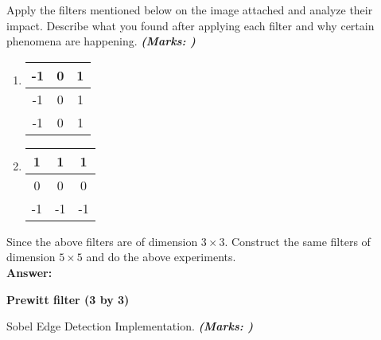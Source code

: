 \documentclass[12pt, a4paper]{exam}
\begin{document}
\vspace{0.2in}
\begin{questions}
	\pointsdroppedatright

	\question
Apply the filters mentioned below on the image attached and analyze their impact.
Describe what you found after applying each filter
and why certain phenomena are happening. \textbf{\textit{(Marks: )}}\\

\begin{enumerate}

\item \begin{center}
\begin{tabular}{|c|c|c|}
\hline
-1 & 0 & 1 \\ \hline
-1 & 0 & 1 \\ \hline
-1 & 0 & 1 \\ \hline
\end{tabular}
\end{center}

\item \begin{center}
\begin{tabular}{|c|c|c|}
\hline
1 & 1 & 1 \\ \hline
0 & 0 & 0 \\ \hline
-1 & -1 & -1 \\ \hline
\end{tabular}
\end{center}

\end{enumerate}

Since the above filters are of dimension $3 \times 3$. Construct the same filters of dimension $5 \times 5$ and do the above experiments.
\vspace{0.2in}
    \pointsdroppedatright\\

\textbf{Answer:}

\textbf{Prewitt filter (3 by 3)}



\vspace{0.2in}

\newpage
	\question
 Sobel Edge Detection Implementation. \textbf{\textit{(Marks: )}}
\end{questions}
\end{document}
